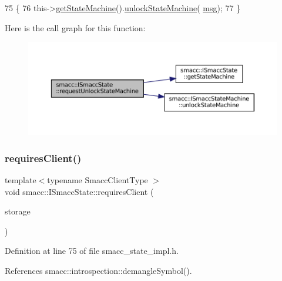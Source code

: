 \begin{DoxyCode}
75 \{
76     this->\hyperlink{classsmacc_1_1ISmaccState_a562bb3f9a3ac16b8be71e4794c9e7523}{getStateMachine}().\hyperlink{classsmacc_1_1ISmaccStateMachine_ae2e3ceb87bfe3f9d8bf320e36071fdc7}{unlockStateMachine}(
      \hyperlink{namespacebattery__monitor__node_ab1920c64448816edd4064e494275fdff}{msg});
77 \}
\end{DoxyCode}
Here is the call graph for this function\+:
\nopagebreak
\begin{figure}[H]
\begin{center}
\leavevmode
\includegraphics[width=350pt]{classsmacc_1_1ISmaccState_a3bf006f25d5b9c0534c8e89ae2e93d40_cgraph}
\end{center}
\end{figure}
\mbox{\label{classsmacc_1_1ISmaccState_a7f95c9f0a6ea2d6f18d1aec0519de4ac}} 
\subsubsection{\texorpdfstring{requires\+Client()}{requiresClient()}}
{\footnotesize\ttfamily template$<$typename Smacc\+Client\+Type $>$ \\
void smacc\+::\+I\+Smacc\+State\+::requires\+Client (\begin{DoxyParamCaption}\item[{Smacc\+Client\+Type $\ast$\&}]{storage }\end{DoxyParamCaption})}



Definition at line 75 of file smacc\+\_\+state\+\_\+impl.\+h.



References smacc\+::introspection\+::demangle\+Symbol().



